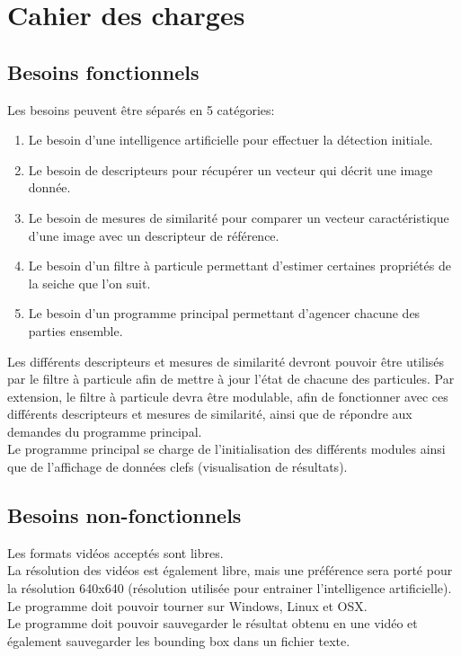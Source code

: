 




\section{Cahier des charges}

\subsection{Besoins fonctionnels}
Les besoins peuvent être séparés en 5 catégories:
\begin{enumerate}
	\item Le besoin d'une intelligence artificielle pour effectuer la détection initiale.
	\item Le besoin de descripteurs pour récupérer un vecteur qui décrit une image donnée.
	\item Le besoin de mesures de similarité pour comparer un vecteur caractéristique d'une image avec un descripteur de référence.
	\item Le besoin d'un filtre à particule permettant d'estimer certaines propriétés de la seiche que l'on suit.
	\item Le besoin d'un programme principal permettant d'agencer chacune des parties ensemble.\\
\end{enumerate}

Les différents descripteurs et mesures de similarité devront pouvoir être utilisés par le filtre à particule afin de mettre à jour l'état de chacune des particules. Par extension, le filtre à particule devra être modulable, afin de fonctionner avec ces différents descripteurs et mesures de similarité, ainsi que de répondre aux demandes du programme principal.\\
Le programme principal se charge de l'initialisation des différents modules ainsi que de l'affichage de données clefs (visualisation de  résultats).\\

\subsection{Besoins non-fonctionnels}
Les formats vidéos acceptés sont libres.\\
La résolution des vidéos est également libre, mais une préférence sera porté pour la résolution 640x640 (résolution utilisée pour entrainer l'intelligence artificielle).\\
Le programme doit pouvoir tourner sur Windows, Linux et OSX.\\
Le programme doit pouvoir sauvegarder le résultat obtenu en une vidéo et également sauvegarder les bounding box dans un fichier texte.\\

